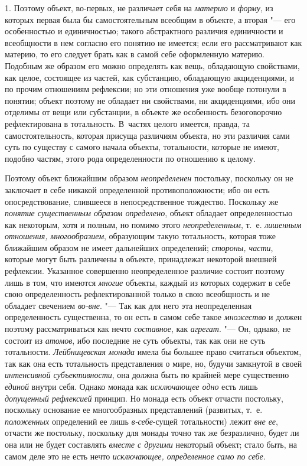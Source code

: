 {{1. Поэтому объект, во-первых, не различает себя на {\em материю} и
{\em форму}, из которых первая была бы самостоятельным всеобщим в объекте,
а вторая "--- его особенностью и единичностью; такого абстрактного
различия единичности и всеобщности в нем согласно его понятию не имеется;
если его рассматривают как материю, то его следует брать как в самой себе
оформленную материю. Подобным же образом его можно определять как вещь,
обладающую свойствами, как целое, состоящее из частей, как субстанцию,
обладающую акциденциями, и по прочим отношениям рефлексии; но эти отношения
уже вообще потонули в понятии; объект поэтому не обладает ни свойствами, ни
акциденциями, ибо они отделимы от вещи или субстанции, в объекте же
особенность безоговорочно рефлектирована в тотальность. В~частях целого
имеется, правда, та самостоятельность, которая присуща различиям объекта,
но эти различия сами суть по существу с самого начала объекты, тотальности,
которые не имеют, подобно частям, этого рода определенности по отношению к
целому.

Поэтому объект ближайшим образом {\em неопределенен}
постольку, поскольку он не заключает в себе никакой
определенной противоположности; ибо он есть опосредствование, слившееся в
непосредственное тождество. Поскольку же {\em понятие существенным образом
определено}, объект обладает определенностью как некоторым,
хотя и полным, но помимо этого {\em неопределенным},
т.~е. {\em лишенным отношения, многообразием}, образующим такую тотальность,
которая тоже ближайшим образом не имеет дальнейших определений;
{\em стороны, части},
которые могут быть различены в объекте, принадлежат некоторой
внешней рефлексии. Указанное совершенно неопределенное различие состоит
поэтому лишь в том, что имеются {\em многие} объекты,
каждый из которых содержит в себе свою определенность рефлектированной
только в свою всеобщность и не обладает свечением {\em во-вне}. "--- Так как
для него эта неопределенная определенность существенна, то он есть в самом
себе такое {\em множество} и должен поэтому рассматриваться как нечто
{\em составное}, как {\em агрегат}. "--- Он,
однако, не состоит из {\em атомов},
ибо последние не суть объекты, так как они не суть
тотальности. {\em Лейбницевская монада}
имела бы большее право считаться объектом, так как она есть
тотальность представления о мире, но, будучи замкнутой в своей
{\em интенсивной субъективности}, она должна быть по крайней мере существенно
{\em единой} внутри себя. Однако монада как {\em исключающее
одно} есть лишь {\em допущенный рефлексией}
принцип. Но монада есть объект отчасти постольку, поскольку
основание ее многообразных представлений (развитых, т.~е.
{\em положенных} определений ее лишь {\em в-себе}{}-сущей
тотальности) лежит {\em вне ее},
отчасти же постольку, поскольку для монады точно так же
безразлично, будет ли она или не будет составлять {\em вместе с другими}
некоторый объект; стало быть, на самом деле это не есть нечто
{\em исключающее, определенное само по себе}.

}}
